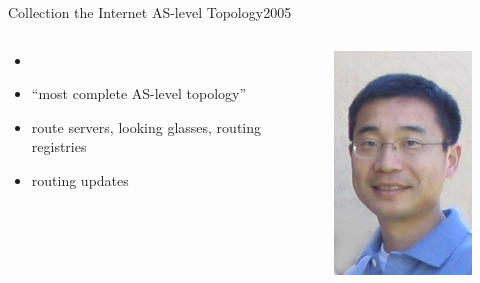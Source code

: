 \documentclass[ngerman,compress,hyperref={bookmarks}]{beamer}
\begin{document}
\begin{frame}{Collection the Internet AS-level Topology}{2005}
\begin{columns}[c]
 \begin{column}{0.5\textwidth}
  \begin{itemize}
   \item \cite{Zhang:2005:CIA:1052812.1052825}
   \item ``most complete AS-level topology''
   \item route servers, looking glasses, routing registries
   \item routing updates
  \end{itemize}
 \end{column}
 \begin{column}{0.08\textwidth}
  \begin{figure}
   \label{zhang_et_al}
   \includegraphics[width=1\textwidth]{images/zhang_b}\\

\end{figure}
\end{column}
\end{columns}
\end{frame}
\end{document}
